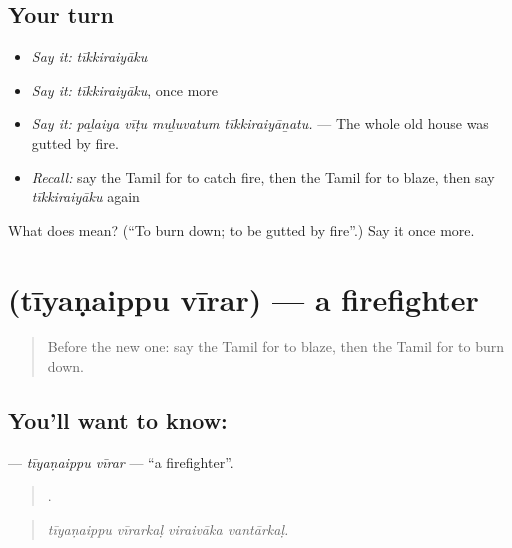 \subsection*{Your turn}
\begin{itemize}
\raggedright
  \item \emph{Say it:} \emph{tīkkiraiyāku}
  \item \emph{Say it:} \emph{tīkkiraiyāku}, once more
  \item \emph{Say it:} \emph{paḻaiya vīṭu muḻuvatum tīkkiraiyāṉatu.} — The whole old house was gutted by fire.
  \item \emph{Recall:} say the Tamil for to catch fire, then the Tamil for to blaze, then say \emph{tīkkiraiyāku} again
\end{itemize}

\begin{tcolorbox}[breakable,colback=teal!4,colframe=teal!35!black,title={Before you move on}]
What does  mean? (\textquotedblleft{}To burn down; to be gutted by fire\textquotedblright{}.) Say it once more.
\end{tcolorbox}
\section[\texorpdfstring{\ta{தீயணைப்பு} \ta{வீரர்} (tīyaṇaippu vīrar)}{தீயணைப்பு வீரர் (tīyaṇaippu vīrar)}]{  (tīyaṇaippu vīrar) — a firefighter}

\label{lesson:TA-C299-tiyanaippu-virar}



\begin{quote}
Before the new one: say the Tamil for to blaze, then the Tamil for to burn down.
\end{quote}

\subsection*{You'll want to know:  }
\textbf{ } — \emph{tīyaṇaippu vīrar} — \textquotedblleft{}a firefighter\textquotedblright{}.

\begin{quote}
   .
\end{quote}

\begin{quote}
\emph{tīyaṇaippu vīrarkaḷ viraivāka vantārkaḷ.}
\end{quote}

